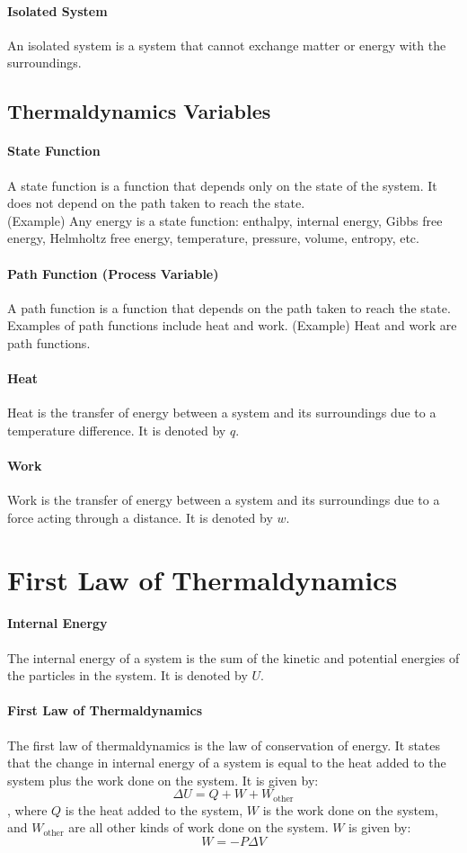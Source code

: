 \documentclass[11pt]{article}
\begin{document}
\paragraph{Isolated System} An isolated system is a system that cannot exchange matter or energy with the surroundings.
\subsection{Thermaldynamics Variables}
\paragraph{State Function} A state function is a function that depends only on the state of the system. It does not depend on the path taken to reach the state. \\
(Example) Any energy is a state function: enthalpy, internal energy, Gibbs free energy, Helmholtz free energy, temperature, pressure, volume, entropy, etc.
\paragraph{Path Function (Process Variable)} A path function is a function that depends on the path taken to reach the state. Examples of path functions include heat and work.
(Example) Heat and work are path functions.
\paragraph{Heat} Heat is the transfer of energy between a system and its surroundings due to a temperature difference. It is denoted by $q$.
\paragraph{Work} Work is the transfer of energy between a system and its surroundings due to a force acting through a distance. It is denoted by $w$.
\section{First Law of Thermaldynamics}
\paragraph{Internal Energy} The internal energy of a system is the sum of the kinetic and potential energies of the particles in the system. It is denoted by $U$.
\paragraph{First Law of Thermaldynamics} The first law of thermaldynamics is the law of conservation of energy. It states that the change in internal energy of a system is equal to the heat added to the system plus the work done on the system. It is given by:
\begin{equation}
    \Delta U = Q + W + W_{\text{other}}
\end{equation}
, where $Q$ is the heat added to the system, $W$ is the work done on the system, and $W_{\text{other}}$ are all other kinds of work done on the system. $W$ is given by:
\begin{equation}
    W = -P\Delta V
\end{equation}
\end{document}
